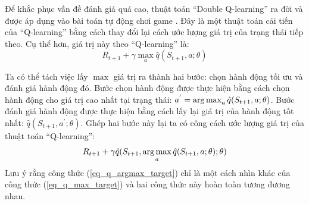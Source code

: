 	Để khắc phục vấn đề đánh giá quá cao, thuật toán ``Double Q-learning'' \cite{hasselt2010double} ra đời và được áp dụng vào bài toán tự động chơi game \cite{van2015deep}.
	Đây là một thuật toán cải tiến của ``Q-learning'' bằng cách thay đổi lại cách ước lượng giá trị của trạng thái tiếp theo.
	Cụ thể hơn, giá trị này theo ``Q-learning'' là: 
	\begin{equation}
		\label{eq_q_max_target}
		R_{t+1} + \gamma \max_{a}\hat{q}(S_{t+1}, a;\theta)
	\end{equation}
	
	Ta có thể tách việc lấy $\max$ giá trị ra thành hai bước: chọn hành động tối ưu và đánh giá hành động đó.
	Bước chọn hành động được thực hiện bằng cách chọn hành động cho giá trị cao nhất tại trạng thái: $a^{'} = \operatorname*{arg\,max}_{a}\hat{q}(S_{t+1}, a;\theta)$.
	Bước đánh giá hành động được thực hiện bằng cách lấy lại giá trị của hành động tốt nhất: $\hat{q}(S_{t+1}, a^{'};\theta)$.
	Ghép hai bước này lại ta có công cách ước lượng giá trị của thuật toán ``Q-learning'':
	\begin{equation}
		\label{eq_q_argmax_target}
		R_{t+1} + \gamma \hat{q}(S_{t+1}, \operatorname*{arg\,max}_{a}\hat{q}(S_{t+1}, a;\theta); \theta)
	\end{equation}
	Lưu ý rằng công thức (\ref{eq_q_argmax_target}) chỉ là một cách nhìn khác của công thức (\ref{eq_q_max_target}) và hai công thức này hoàn toàn tương đương nhau.
	

